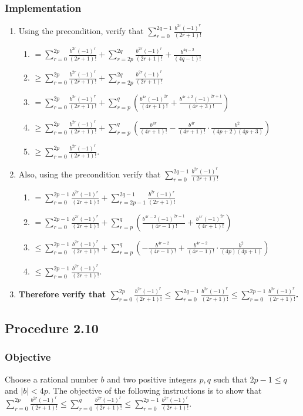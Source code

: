 \documentclass[twocolumn]{article}
\newcommand{\procedure}[2][]{\subsection*{Procedure #2 \ifthenelse{\equal{#1}{}}{}{(#1)}}\label{sec:procedure #2}}
\newcommand{\objective}{\subsubsection*{Objective}}
\newcommand{\implementation}{\subsubsection*{Implementation}}
\begin{document}
			\implementation
				\begin{enumerate}
					\item Using the precondition, verify that $\sum_{r=0}^{2q-1}\frac{b^{2r}(-1)^r}{(2r+1)!}$
					\begin{enumerate}
						\item $=\sum_{r=0}^{2p}\frac{b^{2r}(-1)^r}{(2r+1)!}+\sum_{r=2p}^{2q}\frac{b^{2r}(-1)^r}{(2r+1)!}+\frac{b^{4q-2}}{(4q-1)!}$
						\item $\ge\sum_{r=0}^{2p}\frac{b^{2r}(-1)^r}{(2r+1)!}+\sum_{r=2p}^{2q}\frac{b^{2r}(-1)^r}{(2r+1)!}$
						\item $=\sum_{r=0}^{2p}\frac{b^{2r}(-1)^r}{(2r+1)!}+\sum_{r=p}^{q}(\frac{b^{4r}(-1)^{2r}}{(4r+1)!}+\frac{b^{4r+2}(-1)^{2r+1}}{(4r+3)!})$
						\item $\ge\sum_{r=0}^{2p}\frac{b^{2r}(-1)^r}{(2r+1)!}+\sum_{r=p}^{q}(\frac{b^{4r}}{(4r+1)!}-\frac{b^{4r}}{(4r+1)!}\cdot\frac{b^2}{(4p+2)(4p+3)})$
						\item $\ge\sum_{r=0}^{2p}\frac{b^{2r}(-1)^r}{(2r+1)!}$.
					\end{enumerate}
					\item Also, using the precondition verify that $\sum_{r=0}^{2q-1}\frac{b^{2r}(-1)^r}{(2r+1)!}$
					\begin{enumerate}
						\item $=\sum_{r=0}^{2p-1}\frac{b^{2r}(-1)^r}{(2r+1)!}+\sum_{r=2p-1}^{2q-1}\frac{b^{2r}(-1)^r}{(2r+1)!}$
						\item $=\sum_{r=0}^{2p-1}\frac{b^{2r}(-1)^r}{(2r+1)!}+\sum_{r=p}^{q}(\frac{b^{4r-2}(-1)^{2r-1}}{(4r-1)!}+\frac{b^{4r}(-1)^{2r}}{(4r+1)!})$
						\item $\le\sum_{r=0}^{2p-1}\frac{b^{2r}(-1)^r}{(2r+1)!}+\sum_{r=p}^{q}(-\frac{b^{4r-2}}{(4r-1)!}+\frac{b^{4r-2}}{(4r-1)!}\cdot\frac{b^2}{(4p)(4p+1)})$
						\item $\le\sum_{r=0}^{2p-1}\frac{b^{2r}(-1)^r}{(2r+1)!}$.
					\end{enumerate}
					\item \textbf{Therefore verify that $\sum_{r=0}^{2p}\frac{b^{2r}(-1)^r}{(2r+1)!}\le\sum_{r=0}^{2q-1}\frac{b^{2r}(-1)^r}{(2r+1)!}\le\sum_{r=0}^{2p-1}\frac{b^{2r}(-1)^r}{(2r+1)!}$.}
				\end{enumerate}
		\procedure{2.10}
			\objective
				Choose a rational number $b$ and two positive integers $p,q$ such that $2p-1\le q$ and $\lvert b\rvert<4p$. The objective of the following instructions is to show that $\sum_{r=0}^{2p}\frac{b^{2r}(-1)^r}{(2r+1)!}\le\sum_{r=0}^{q}\frac{b^{2r}(-1)^r}{(2r+1)!}\le\sum_{r=0}^{2p-1}\frac{b^{2r}(-1)^r}{(2r+1)!}$.
\end{document}
